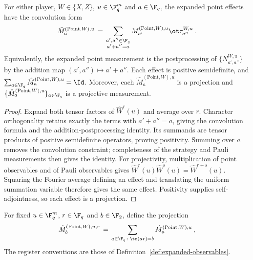 \begin{lemma}
	\label{lem:expanded-point-measurement-properties}
	\leanok
	For either player, $W \in \{X,Z\}$, $u \in \F_q^m$ and $a \in \F_q$,
	the expanded point effects have the convolution form
	\[
		\hat{M}^{(\mathrm{Point},W),u}_a
		\,=\, \sum_{\substack{a',a'' \in \F_q \\ a' + a'' = a}}
		M^{(\mathrm{Point},W),u}_{a'} \ot \tau^{W,u}_{a''}\,.
	\]
	Equivalently, the expanded point measurement is the postprocessing
	of $\{N^{W,u}_{a',a''}\}$ by the addition map $(a',a'')\mapsto a'+a''$.
	Each effect is positive semidefinite, and
	$\sum_{a \in \F_q}\hat{M}^{(\mathrm{Point},W),u}_a=\Id$.
	Moreover, each $\hat{M}^{(\mathrm{Point},W),u}_a$ is a projection
	and $\{\hat{M}^{(\mathrm{Point},W),u}_a\}_{a \in \F_q}$ is a projective
	measurement.
\end{lemma}
\begin{proof}
	\leanok
	Expand both tensor factors of $\hat{W}^r(u)$ and average over $r$.
	Character orthogonality retains exactly the terms with $a'+a''=a$,
	giving the convolution formula and the addition-postprocessing identity.
	Its summands are tensor products of positive semidefinite operators,
	proving positivity. Summing over $a$
	removes the convolution constraint; completeness of the strategy and
	Pauli measurements then gives the identity.
	For projectivity, multiplication of point observables and of Pauli
	observables gives $\hat{W}^r(u)\hat{W}^s(u)=\hat{W}^{r+s}(u)$.
	Squaring the Fourier average defining an effect and translating the
	uniform summation variable therefore gives the same effect.
	Positivity supplies self-adjointness, so each effect is a projection.
\end{proof}

\begin{definition}
	\label{def:expanded-point-trace-projection}
	\leanok
	For fixed $u \in \F_q^m$, $r \in \F_q$ and $b \in \F_2$, define the
	projection
	\begin{equation}\label{eq:qld-def-mptur}
		\hat{M}^{(\mathrm{Point},W),u,r}_b \,=\, \sum_{a \in \F_q \colon \tr(ar) = b} \hat{M}^{(\mathrm{Point},W),u}_a\,,
	\end{equation}
	The register conventions are those of
	Definition~\ref{def:expanded-observables}.
\end{definition}

